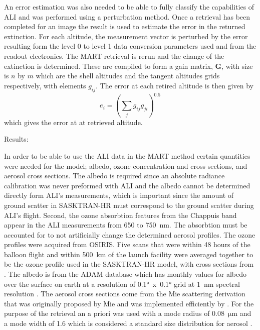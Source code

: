 An error estimation was also needed to be able to fully classify the capabilities of ALI and was performed using a perturbation method. Once a retrieval has been completed for an image the result is used to estimate the error in the returned extinction. For each altitude, the measurement vector is perturbed by the error resulting form the level 0 to level 1 data conversion parameters used and from the readout electronics. The MART retrieval is rerun and the change of the extinction is determined. These are compiled to form a gain matrix, $\mathbf{G}$, with size is $n$ by $m$ which are the shell altitudes and the tangent altitudes grids respectively, with elements $g_{ij}$. The error at each retired altitude is then given by
\begin{equation}
    e_{i} = \left(\sum_{j}g_{ij}g_{ji}\right)^{0.5}
\end{equation}
which gives the error at at retrieved altitude.

Results:

In order to be able to use the ALI data in the MART method certain quantities were needed for the model; albedo, ozone concentration and cross sections, and aerosol cross sections. The albedo is required since an absolute radiance calibration was never preformed with ALI and the albedo cannot be determined directly form ALI's measurements, which is important since the amount of ground scatter in SASKTRAN-HR must correspond to the ground scatter during ALI's flight. Second, the ozone absorbtion features from the Chappuis band appear in the ALI measurements from 650 to 750~nm. The absorbtion must be accounted for to not artificially change the determined aerosol profiles. The ozone profiles were acquired from OSIRIS. Five scans that were within 48 hours of the balloon flight and  within 500~km of the launch facility were averaged together to be the ozone profile used in the SASKTRAN-HR model, with cross sections from \cite{Burrows1999}. The albedo is from the ADAM database which has monthly values for albedo over the surface on earth at a resolution of 0.1\si{\degree}~x~0.1\si{\degree} grid at 1~nm spectral resolution \citep{Muller2013}. The aerosol cross sections come from the Mie scattering derivation that was originally proposed by Mie and was implemented efficiently by \cite{Wiscombe1980}. For the purpose of the retrieval an a priori was used with a mode radius of 0.08~$\si{\micro\metre}$  and a mode width of 1.6 which is considered a standard size distribution for aerosol \citep{Deshler2003}.

